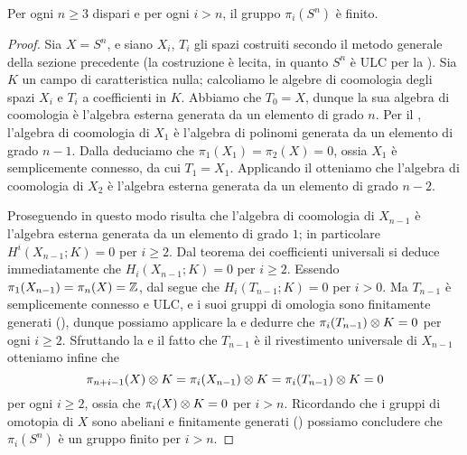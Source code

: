 \begin{theorem}
Per ogni \(n\ge 3\) dispari e per ogni \(i>n\), il gruppo \(\pi_i(S^n)\) è finito.
\end{theorem}
\begin{proof}
Sia \(X=S^n\), e siano \(X_i\), \(T_i\) gli spazi costruiti secondo il metodo generale della sezione precedente (la costruzione è lecita, in quanto \(S^n\) è ULC per la ). Sia \(K\) un campo di caratteristica nulla; calcoliamo le algebre di coomologia degli spazi \(X_i\) e \(T_i\) a coefficienti in \(K\). Abbiamo che \(T_0=X\), dunque la sua algebra di coomologia è l'algebra esterna generata da un elemento di grado \(n\). Per il , l'algebra di coomologia di \(X_1\) è l'algebra di polinomi generata da un elemento di grado \(n-1\). Dalla  deduciamo che \(\pi_1(X_1)=\pi_2(X)=0\), ossia \(X_1\) è semplicemente connesso, da cui \(T_1=X_1\). Applicando il  otteniamo che l'algebra di coomologia di \(X_2\) è l'algebra esterna generata da un elemento di grado \(n-2\).

Proseguendo in questo modo risulta che l'algebra di coomologia di \(X_{n-1}\) è l'algebra esterna generata da un elemento di grado \(1\); in particolare \(H^i(X_{n-1};K)=0\) per \(i\ge 2\). Dal teorema dei coefficienti universali si deduce immediatamente che \(H_i(X_{n-1};K)=0\) per \(i\ge 2\). Essendo \(\pi_1(X_{n-1})=\pi_n(X)=\mathbb{Z}\), dal  segue che \(H_i(T_{n-1};K)=0\) per \(i>0\). Ma \(T_{n-1}\) è semplicemente connesso e ULC, e i suoi gruppi di omologia sono finitamente generati (), dunque possiamo applicare la  e dedurre che \(\pi_i(T_{n-1})\mathbin{\otimes} K=0\) per ogni \(i\ge 2\). Sfruttando la  e il fatto che \(T_{n-1}\) è il rivestimento universale di \(X_{n-1}\) otteniamo infine che 
\[
\pi_{n+i-1}(X)\mathbin{\otimes} K=\pi_i(X_{n-1})\mathbin{\otimes} K=\pi_i(T_{n-1})\mathbin{\otimes} K=0
\]
per ogni \(i\ge 2\), ossia che \(\pi_i(X)\mathbin{\otimes} K=0\) per \(i>n\). Ricordando che i gruppi di omotopia di \(X\) sono abeliani e finitamente generati () possiamo concludere che \(\pi_i(S^n)\) è un gruppo finito per \(i>n\).
\end{proof}